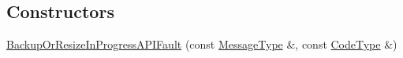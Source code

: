 \subsection*{Constructors}
\begin{DoxyCompactItemize}
\item 
\hypertarget{classopenstack_1_1xml_1_1BackupOrResizeInProgressAPIFault_aed5415612fcc37114c2b5d62ceba4878}{
\hyperlink{classopenstack_1_1xml_1_1BackupOrResizeInProgressAPIFault_aed5415612fcc37114c2b5d62ceba4878}{BackupOrResizeInProgressAPIFault} (const \hyperlink{classopenstack_1_1xml_1_1CloudServersAPIFault_aff7b9d2067747fa033a0ea4408011af6}{MessageType} \&, const \hyperlink{classopenstack_1_1xml_1_1CloudServersAPIFault_aa9f350c9dba08ae375b2a61568551550}{CodeType} \&)}
\label{classopenstack_1_1xml_1_1BackupOrResizeInProgressAPIFault_aed5415612fcc37114c2b5d62ceba4878}


\end{DoxyCompactItemize}
